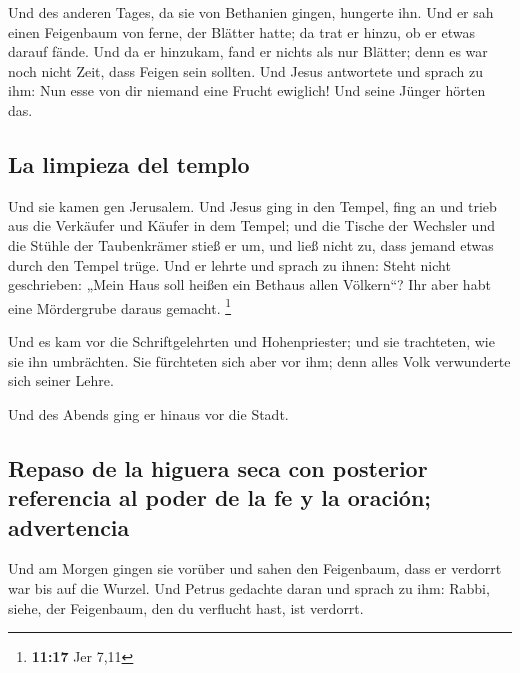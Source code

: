 Und des anderen Tages, da sie von Bethanien gingen,
hungerte ihn.  Und er sah einen Feigenbaum von ferne, der
Blätter hatte; da trat er hinzu, ob er etwas darauf fände. Und da er
hinzukam, fand er nichts als nur Blätter; denn es war noch nicht Zeit,
dass Feigen sein sollten.  Und Jesus antwortete und
sprach zu ihm: Nun esse von dir niemand eine Frucht ewiglich! Und seine
Jünger hörten das.

\hypertarget{la-limpieza-del-templo}{%
\subsection{La limpieza del templo}\label{la-limpieza-del-templo}}

 Und sie kamen gen Jerusalem. Und Jesus ging in den
Tempel, fing an und trieb aus die Verkäufer und Käufer in dem Tempel;
und die Tische der Wechsler und die Stühle der Taubenkrämer stieß er um,
 und ließ nicht zu, dass jemand etwas durch den Tempel
trüge.  Und er lehrte und sprach zu ihnen: Steht nicht
geschrieben: „Mein Haus soll heißen ein Bethaus allen Völkern``? Ihr
aber habt eine Mördergrube daraus gemacht. \footnote{\textbf{11:17} Jer
  7,11}

 Und es kam vor die Schriftgelehrten und Hohenpriester;
und sie trachteten, wie sie ihn umbrächten. Sie fürchteten sich aber vor
ihm; denn alles Volk verwunderte sich seiner Lehre.

 Und des Abends ging er hinaus vor die Stadt.

\hypertarget{repaso-de-la-higuera-seca-con-posterior-referencia-al-poder-de-la-fe-y-la-oraciuxf3n-advertencia}{%
\subsection{Repaso de la higuera seca con posterior referencia al poder
de la fe y la oración;
advertencia}\label{repaso-de-la-higuera-seca-con-posterior-referencia-al-poder-de-la-fe-y-la-oraciuxf3n-advertencia}}

 Und am Morgen gingen sie vorüber und sahen den
Feigenbaum, dass er verdorrt war bis auf die Wurzel.  Und
Petrus gedachte daran und sprach zu ihm: Rabbi, siehe, der Feigenbaum,
den du verflucht hast, ist verdorrt.

